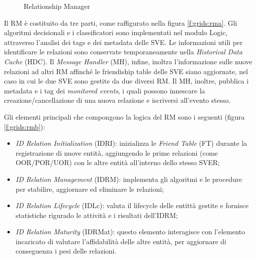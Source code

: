 \begin{figure}[h!t]
\centering
{}
\qquad %
\caption{Relationship Manager}
\label{f:grids:rm}
\end{figure}

Il RM è costituito da tre parti, come raffigurato nella figura \ref{f:grids:rma}. Gli algoritmi decisionali e i classificatori sono implementati nel modulo Logic, attraverso l'analisi dei tags e dei metadata delle SVE. Le informazioni utili per identificare le relazioni sono conservate temporaneamente nella \textit{Historical Data Cache} (HDC). Il \textit{Message Handler} (MH), infine, inoltra l'informazione sulle nuove relazioni ad altri RM affinch\'e le friendiship table delle SVE siano aggiornate, nel caso in cui le due SVE sono gestite da due diversi RM. Il MH, inoltre, pubblica i metadata e i tag dei \textit{monitored events}, i quali possono innescare la creazione/cancellazione di una nuova relazione e iscriversi all'evento stesso.

Gli elementi principali che compongono la logica del RM sono i seguenti (figura \ref{f:grids:rmb}):

\begin{itemize}
    \item \textit{ID Relation Initialization} (IDRI): inizializza le \textit{Friend Table} (FT) durante la registrazione di nuove entità, aggiungendo le prime relazioni (come OOR/POR/UOR) con le altre entità all'interno dello stesso SVER;
    \item \textit{ID Relation Management} (IDRM): implementa gli algoritmi e le procedure per stabilire, aggiornare ed eliminare le relazioni;
    \item \textit{ID Relation Lifecycle} (IDLc): valuta il lifecycle delle entittà gestite e fornisce statistiche rigurado le attività e i risultati dell'IDRM;
    \item \textit{ID Relation Maturity} (IDRMat): questo elemento interagisce con l'elemento incaricato di valutare l'affidabilità delle altre entità, per aggiornare di conseguenza i pesi delle relazioni.
\end{itemize}

